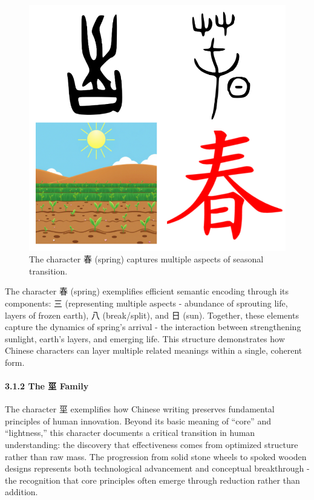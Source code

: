 \begin{figure}
\centering
\includegraphics{./images/zi_spring.png}
\caption{The character 春 (spring) captures multiple aspects of seasonal
transition.}
\end{figure}

The character 春 (spring) exemplifies efficient semantic encoding
through its components: 三 (representing multiple aspects - abundance of
sprouting life, layers of frozen earth), 八 (break/split), and 日 (sun).
Together, these elements capture the dynamics of spring's arrival - the
interaction between strengthening sunlight, earth's layers, and emerging
life. This structure demonstrates how Chinese characters can layer
multiple related meanings within a single, coherent form.

\paragraph{3.1.2 The 坙 Family}\label{the-ux5759-family}

The character 坙 exemplifies how Chinese writing preserves fundamental
principles of human innovation. Beyond its basic meaning of ``core'' and
``lightness,'' this character documents a critical transition in human
understanding: the discovery that effectiveness comes from optimized
structure rather than raw mass. The progression from solid stone wheels
to spoked wooden designs represents both technological advancement and
conceptual breakthrough - the recognition that core principles often
emerge through reduction rather than addition.

